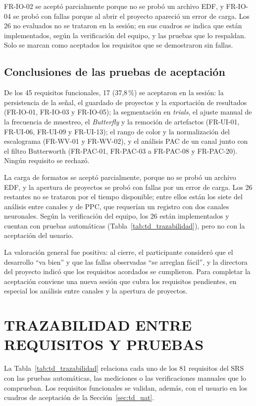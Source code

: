 \documentclass[12pt,letterpaper,oneside]{article}
\DeclareRobustCommand{\_}{\textunderscore\allowbreak}
\newcommand{\capitulo}[1]{\clearpage\section{#1}}
\begin{document}
FR-IO-02 se aceptó parcialmente porque no se probó un archivo EDF, y FR-IO-04 se probó con fallas porque al abrir el proyecto apareció un error de carga. Los 26 no evaluados no se trataron en la sesión; en sus cuadros se indica que están implementados, según la verificación del equipo, y las pruebas que lo respaldan. Solo se marcan como aceptados los requisitos que se demostraron sin fallas.

\subsection{Conclusiones de las pruebas de aceptación}
De los 45 requisitos funcionales, 17 (37,8\,\%) se aceptaron en la sesión: la persistencia de la señal, el guardado de proyectos y la exportación de resultados (FR-IO-01, FR-IO-03 y FR-IO-05); la segmentación en \textit{trials}, el ajuste manual de la frecuencia de muestreo, el \textit{Butterfly} y la remoción de artefactos (FR-UI-01, FR-UI-06, FR-UI-09 y FR-UI-13); el rango de color y la normalización del escalograma (FR-WV-01 y FR-WV-02), y el análisis PAC de un canal junto con el filtro Butterworth (FR-PAC-01, FR-PAC-03 a FR-PAC-08 y FR-PAC-20). Ningún requisito se rechazó.

La carga de formatos se aceptó parcialmente, porque no se probó un archivo EDF, y la apertura de proyectos se probó con fallas por un error de carga. Los 26 restantes no se trataron por el tiempo disponible; entre ellos están los siete del análisis entre canales y de PPC, que requerían un registro con dos canales neuronales. Según la verificación del equipo, los 26 están implementados y cuentan con pruebas automáticas (Tabla~\ref{tab:td_trazabilidad}), pero no con la aceptación del usuario.

La valoración general fue positiva: al cierre, el participante consideró que el desarrollo ``va bien'' y que las fallas observadas ``se arreglan fácil'', y la directora del proyecto indicó que los requisitos acordados se cumplieron. Para completar la aceptación conviene una nueva sesión que cubra los requisitos pendientes, en especial los análisis entre canales y la apertura de proyectos.
\capitulo{TRAZABILIDAD ENTRE REQUISITOS Y PRUEBAS}
La Tabla~\ref{tab:td_trazabilidad} relaciona cada uno de los 81 requisitos del SRS con las pruebas automáticas, las mediciones o las verificaciones manuales que lo comprueban. Los requisitos funcionales se validan, además, con el usuario en los cuadros de aceptación de la Sección~\ref{sec:td_uat}.
\end{document}
